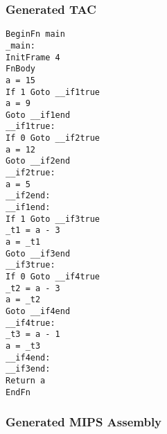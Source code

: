 \subsubsection{Generated TAC}
\begin{lstlisting}[showstringspaces=false,breaklines=true,backgroundcolor=\color{light-gray}, captionpos=b]
BeginFn main
_main:
InitFrame 4
FnBody
a = 15
If 1 Goto __if1true
a = 9
Goto __if1end
__if1true:
If 0 Goto __if2true
a = 12
Goto __if2end
__if2true:
a = 5
__if2end:
__if1end:
If 1 Goto __if3true
_t1 = a - 3
a = _t1
Goto __if3end
__if3true:
If 0 Goto __if4true
_t2 = a - 3
a = _t2
Goto __if4end
__if4true:
_t3 = a - 1
a = _t3
__if4end:
__if3end:
Return a
EndFn

\end{lstlisting}\subsubsection{Generated MIPS Assembly}
